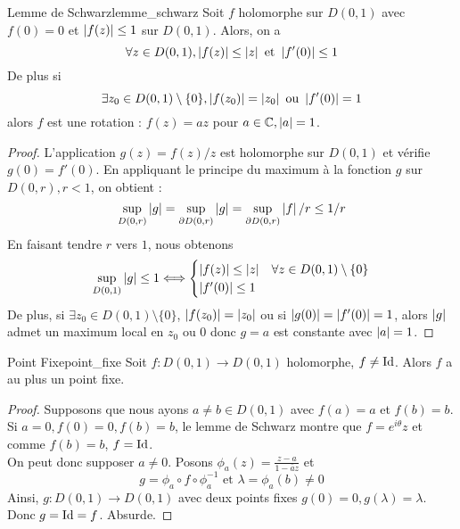 \documentclass{cours}
\begin{document}
\begin{théorème}{Lemme de Schwarz}{lemme_schwarz}
    Soit $f$ holomorphe sur $D(0, 1)$ avec $f(0) = 0$ et $\left|f(z)\right| \leq 1$ sur $D(0, 1)$. Alors, on a 
    \[
        \forall z \in D(0, 1), \left|f(z)\right| \leq \left|z\right| \text{ et } \left|f'(0)\right|\leq 1
    \]
    De plus si 
    \[
        \exists z_{0}\in D(0, 1)\setminus \{0\}, \left|f(z_{0})\right| = \left|z_{0}\right| \text{ ou } \left|f'(0)\right| = 1
    \]
    alors $f$ est une rotation : $f(z) = az$ pour $a \in \mathbb{C}, \left|a\right| = 1$.
\end{théorème}
\begin{proof}
    L'application $g(z) = f(z)/z$ est holomorphe sur $D(0, 1)$ et vérifie $g(0) = f'(0)$. En appliquant le principe du maximum à la fonction $g$ sur $D(0, r), r < 1$, on obtient : 
    \[
        \sup_{D(0, r)}\left|g\right| = \sup_{\partial D(0, r)}\left|g\right| = \sup_{\partial D(0, r)}\left|f\right|/r \leq 1/r
    \]
    En faisant tendre $r$ vers $1$, nous obtenons
    \[
        \sup_{D(0, 1)}\left|g\right| \leq 1 \Longleftrightarrow \begin{cases}
            \left|f(z)\right| \leq \left|z\right| & \forall z \in D(0, 1)\setminus \{0\}\\
            \left|f'(0)\right| \leq 1 &
        \end{cases}
    \]
    De plus, si $\exists z_{0} \in D(0, 1)\setminus \{0\}$, $\left|f(z_{0})\right| = \left|z_{0}\right|$ ou si $\left|g(0)\right| = \left|f'(0)\right| = 1$, alors $\left|g\right|$ admet un maximum local en $z_{0}$ ou $0$ donc $g = a$ est constante avec $\left|a\right| = 1$.
\end{proof}

\begin{corollaire}{Point Fixe}{point_fixe}
    Soit $f : D(0, 1) \to D(0, 1)$ holomorphe, $f\neq {\rm Id}$. Alors $f$ a au plus un point fixe. 
\end{corollaire}
\begin{proof}
    Supposons que nous ayons $a \neq b \in D(0, 1)$ avec $f(a) = a$ et $f(b) = b$.\\
    Si $a = 0, f(0) = 0, f(b) = b$, le lemme de Schwarz montre que $f = e^{i\theta}z$ et comme $f(b) = b$, $f = \rm Id$.\\
    On peut donc supposer $a \neq 0$. Posons $\phi_{a}(z) = \frac{z - a}{1 - \bar{a}z}$ et 
    \[
        g = \phi_{a} \circ f \circ \phi_{a}^{-1} \text{ et } \lambda = \phi_{a}(b) \neq 0
    \]
    Ainsi, $g : D(0, 1) \to D(0, 1)$ avec deux points fixes $g(0) = 0, g(\lambda) = \lambda$. Donc $g = {\rm Id} = f$. Absurde.
\end{proof}
\end{document}
